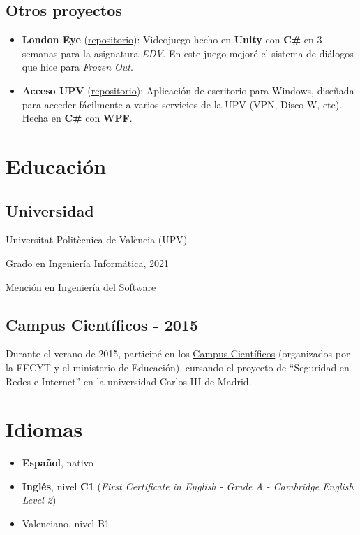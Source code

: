 \documentclass[letterpaper, 12pt, dvipsnames]{article}
\newcommand{\uni}{Universitat Politècnica de València (UPV)}
\newcommand{\fce}{\emph{First Certificate in English - Grade A - Cambridge English Level 2}}
\begin{document}
\subsection{Otros proyectos}

\begin{itemize}
    \item \textbf{London Eye} (\href{https://github.com/algono/London-Eye}{repositorio}): Videojuego hecho en \textbf{Unity} con \textbf{C\#} en 3 semanas para la asignatura \emph{EDV}. En este juego mejoré el sistema de diálogos que hice para \emph{Frozen Out}.
    \item \textbf{Acceso UPV} (\href{https://github.com/algono/AccesoUPV}{repositorio}): Aplicación de escritorio para Windows, diseñada para acceder fácilmente a varios servicios de la UPV (VPN, Disco W, etc). Hecha en \textbf{C\#} con \textbf{WPF}.
\end{itemize}

\section{Educación}

\subsection{Universidad}

{\uni}

Grado en Ingeniería Informática, 2021

Mención en Ingeniería del Software

\subsection{Campus Científicos - 2015}

Durante el verano de 2015, participé en los \href{https://www.campuscientificos.es/}{Campus Científicos} (organizados por la FECYT y el ministerio de Educación), cursando el proyecto de ``Seguridad en Redes e Internet'' en la universidad Carlos III de Madrid.

\section{Idiomas}

\begin{itemize}
    \item \textbf{Español}, nativo
    \item \textbf{Inglés}, nivel \textbf{C1} (\fce)
    \item Valenciano, nivel B1
\end{itemize}
\end{document}

